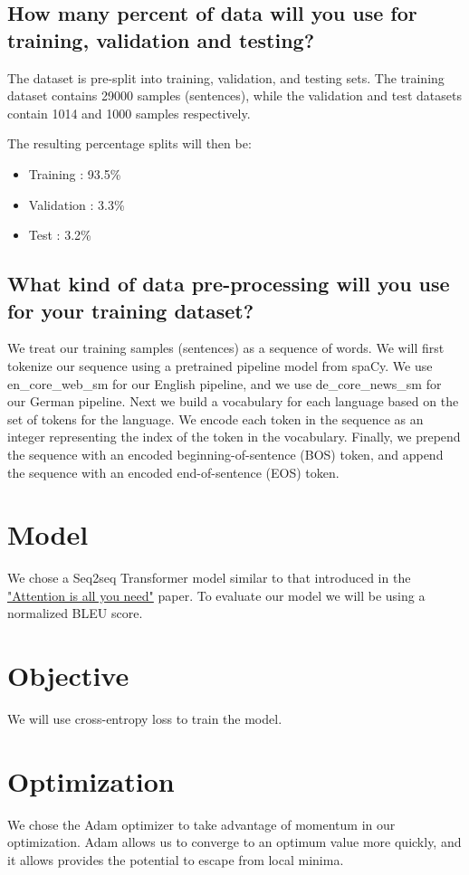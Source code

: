 \documentclass{article}
\begin{document}
\subsection{How many percent of data will you use for training, validation and testing?}
The dataset is pre-split into training, validation, and testing sets. The
training dataset contains 29000 samples (sentences), while the validation
and test datasets contain 1014 and 1000 samples respectively.

The resulting percentage splits will then be:
\begin{itemize}
    \item Training : 93.5\%
    \item Validation : 3.3\%
    \item Test : 3.2\%
\end{itemize}

\subsection{What kind of data pre-processing will you use for your training dataset?}

We treat our training samples (sentences) as a sequence of words. We will first tokenize
our sequence using a pretrained pipeline model from spaCy. We use en\_core\_web\_sm for our
English pipeline, and we use de\_core\_news\_sm for our German pipeline. Next we build a
vocabulary for each language based on the set of tokens for the language. We encode
each token in the sequence as an integer representing the index of the token in the
vocabulary. Finally, we prepend the sequence with an encoded beginning-of-sentence (BOS)
token, and append the sequence with an encoded end-of-sentence (EOS) token.


\section{Model}
We chose a Seq2seq Transformer model similar to that introduced in the
\href{https://arxiv.org/abs/1706.03762}{"Attention is all you need"} paper. To evaluate
our model we will be using a normalized BLEU score.

\section{Objective}
We will use cross-entropy loss to train the model.

\section{Optimization}
We chose the Adam optimizer to take advantage of momentum in our optimization.
Adam allows us to converge to an optimum value more quickly, and it allows
provides the potential to escape from local minima.
\end{document}
